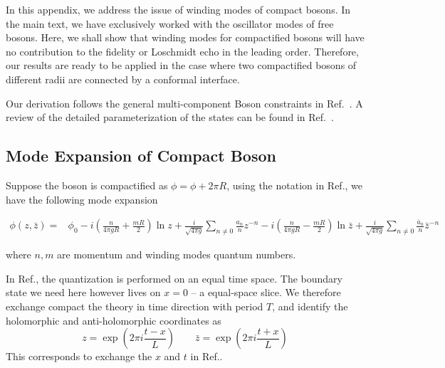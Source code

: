 
In this appendix, we address the issue of winding modes of compact bosons. In the main text, we have exclusively worked with the oscillator modes of free bosons. Here, we shall show that winding modes for compactified bosons will have no contribution to the fidelity or Loschmidt echo in the leading order. Therefore, our results are ready to be applied in the case where two compactified bosons of different radii are connected by a conformal interface\cite{PhysRevLett.118.136801}. 


Our derivation follows the general multi-component Boson constraints in Ref.~. A review of the detailed parameterization of the states can be found in Ref.~. 

\subsection{Mode Expansion of Compact Boson}
Suppose the boson is compactified as $\phi =  \phi + 2\pi R$, using the notation in Ref., we have the following mode expansion 
\begin{widetext}
\begin{equation}
\label{eq:boson-mode-exp}
\begin{aligned}
\phi( z, \bar{z}) = &\phi_0 -i \left( \frac{n}{4\pi g  R} + \frac{m R }{2} \right)  \ln z + \frac{i}{\sqrt{4\pi g}} \sum_{n\ne 0 } \frac{a_n}{n} z^{-n } -i \left( \frac{n}{4\pi g R} - \frac{m R }{2} \right)  \ln \bar{z} + \frac{i}{\sqrt{4\pi g}} \sum_{n\ne 0 } \frac{\bar{a}_n}{n} \bar{z}^{-n } 
\end{aligned}
\end{equation}\end{widetext}
where $n,m$ are momentum and winding modes quantum numbers. 

In Ref., the quantization is performed on an equal time space. The boundary state we need here however lives on $x = 0$ -- a equal-space slice. We therefore exchange compact the theory in time direction with period $T$, and identify the holomorphic and anti-holomorphic coordinates as 
\begin{equation}
\label{eq:zzbar}
z = \exp( 2 \pi i \frac{t - x}{L}) \qquad \bar{z} = \exp( 2 \pi i \frac{t + x}{L})
\end{equation}
This corresponds to exchange the $x$ and $t$ in Ref.. 

